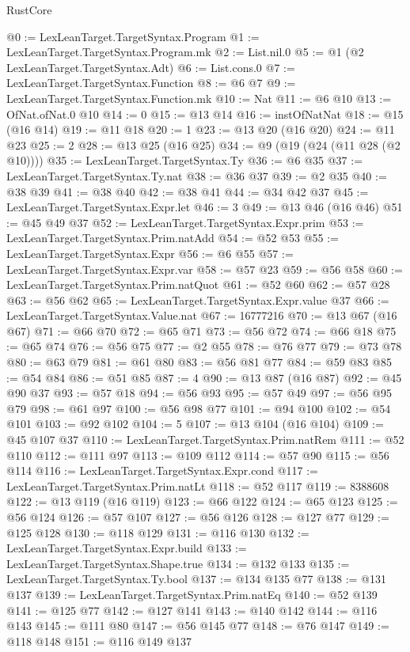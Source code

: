 \begin{lexlean}{RustCore}
\begin{coremodule}
@0 := LexLeanTarget.TargetSyntax.Program
@1 := LexLeanTarget.TargetSyntax.Program.mk
@2 := List.nil.{0}
@5 := @1 (@2 LexLeanTarget.TargetSyntax.Adt)
@6 := List.cons.{0}
@7 := LexLeanTarget.TargetSyntax.Function
@8 := @6 @7
@9 := LexLeanTarget.TargetSyntax.Function.mk
@10 := Nat
@11 := @6 @10
@13 := OfNat.ofNat.{0} @10
@14 := 0
@15 := @13 @14
@16 := instOfNatNat
@18 := @15 (@16 @14)
@19 := @11 @18
@20 := 1
@23 := @13 @20 (@16 @20)
@24 := @11 @23
@25 := 2
@28 := @13 @25 (@16 @25)
@34 := @9 (@19 (@24 (@11 @28 (@2 @10))))
@35 := LexLeanTarget.TargetSyntax.Ty
@36 := @6 @35
@37 := LexLeanTarget.TargetSyntax.Ty.nat
@38 := @36 @37
@39 := @2 @35
@40 := @38 @39
@41 := @38 @40
@42 := @38 @41
@44 := @34 @42 @37
@45 := LexLeanTarget.TargetSyntax.Expr.let
@46 := 3
@49 := @13 @46 (@16 @46)
@51 := @45 @49 @37
@52 := LexLeanTarget.TargetSyntax.Expr.prim
@53 := LexLeanTarget.TargetSyntax.Prim.natAdd
@54 := @52 @53
@55 := LexLeanTarget.TargetSyntax.Expr
@56 := @6 @55
@57 := LexLeanTarget.TargetSyntax.Expr.var
@58 := @57 @23
@59 := @56 @58
@60 := LexLeanTarget.TargetSyntax.Prim.natQuot
@61 := @52 @60
@62 := @57 @28
@63 := @56 @62
@65 := LexLeanTarget.TargetSyntax.Expr.value @37
@66 := LexLeanTarget.TargetSyntax.Value.nat
@67 := 16777216
@70 := @13 @67 (@16 @67)
@71 := @66 @70
@72 := @65 @71
@73 := @56 @72
@74 := @66 @18
@75 := @65 @74
@76 := @56 @75
@77 := @2 @55
@78 := @76 @77
@79 := @73 @78
@80 := @63 @79
@81 := @61 @80
@83 := @56 @81 @77
@84 := @59 @83
@85 := @54 @84
@86 := @51 @85
@87 := 4
@90 := @13 @87 (@16 @87)
@92 := @45 @90 @37
@93 := @57 @18
@94 := @56 @93
@95 := @57 @49
@97 := @56 @95 @79
@98 := @61 @97
@100 := @56 @98 @77
@101 := @94 @100
@102 := @54 @101
@103 := @92 @102
@104 := 5
@107 := @13 @104 (@16 @104)
@109 := @45 @107 @37
@110 := LexLeanTarget.TargetSyntax.Prim.natRem
@111 := @52 @110
@112 := @111 @97
@113 := @109 @112
@114 := @57 @90
@115 := @56 @114
@116 := LexLeanTarget.TargetSyntax.Expr.cond
@117 := LexLeanTarget.TargetSyntax.Prim.natLt
@118 := @52 @117
@119 := 8388608
@122 := @13 @119 (@16 @119)
@123 := @66 @122
@124 := @65 @123
@125 := @56 @124
@126 := @57 @107
@127 := @56 @126
@128 := @127 @77
@129 := @125 @128
@130 := @118 @129
@131 := @116 @130
@132 := LexLeanTarget.TargetSyntax.Expr.build
@133 := LexLeanTarget.TargetSyntax.Shape.true
@134 := @132 @133
@135 := LexLeanTarget.TargetSyntax.Ty.bool
@137 := @134 @135 @77
@138 := @131 @137
@139 := LexLeanTarget.TargetSyntax.Prim.natEq
@140 := @52 @139
@141 := @125 @77
@142 := @127 @141
@143 := @140 @142
@144 := @116 @143
@145 := @111 @80
@147 := @56 @145 @77
@148 := @76 @147
@149 := @118 @148
@151 := @116 @149 @137

\end{coremodule}
\end{lexlean}
